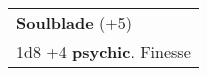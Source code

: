 \documentclass[twocolumn]{article}
\begin{document}
%

\vspace{40pt}

\\
\noindent\begin{tabular}{|m{3.1in}|}
\hline
\textbf{Soulblade} (+5) \\
1d8 +4 \textbf{psychic}. Finesse \\

\hline
\end{tabular}
\vspace{8pt}
\end{document}
